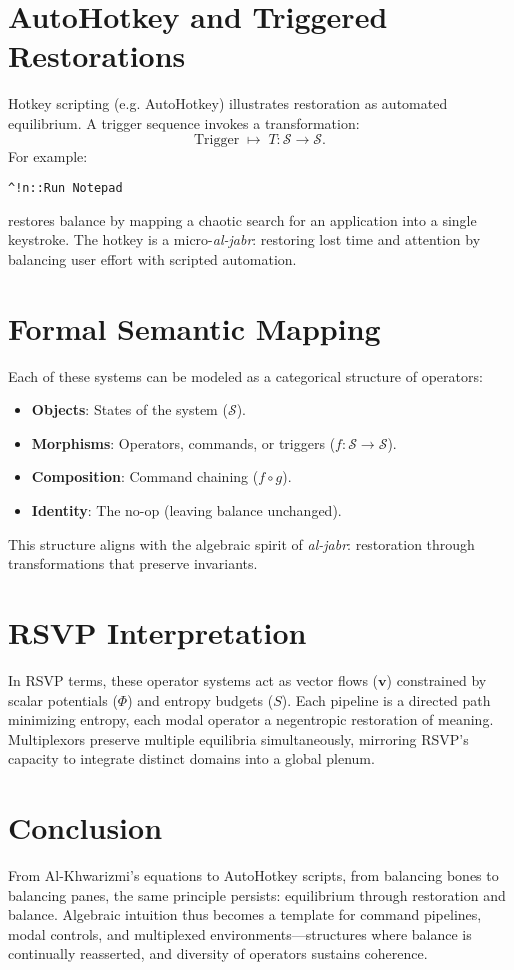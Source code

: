 \documentclass[a4paper,11pt,openany]{book}
\begin{document}
\section{AutoHotkey and Triggered Restorations}
Hotkey scripting (e.g. AutoHotkey) illustrates restoration as automated equilibrium. A trigger sequence invokes a transformation:
\[
\text{Trigger} \;\mapsto\; T : \mathcal{S} \to \mathcal{S}.
\]
For example:
\begin{verbatim}
^!n::Run Notepad
\end{verbatim}
restores balance by mapping a chaotic search for an application into a single keystroke. The hotkey is a micro-\emph{al-jabr}: restoring lost time and attention by balancing user effort with scripted automation.

\section{Formal Semantic Mapping}
Each of these systems can be modeled as a categorical structure of operators:
\begin{itemize}
  \item \textbf{Objects}: States of the system ($\mathcal{S}$).
  \item \textbf{Morphisms}: Operators, commands, or triggers ($f:\mathcal{S}\to\mathcal{S}$).
  \item \textbf{Composition}: Command chaining ($f\circ g$).
  \item \textbf{Identity}: The no-op (leaving balance unchanged).
\end{itemize}
This structure aligns with the algebraic spirit of \emph{al-jabr}: restoration through transformations that preserve invariants.

\section{RSVP Interpretation}
In RSVP terms, these operator systems act as vector flows ($\mathbf{v}$) constrained by scalar potentials ($\Phi$) and entropy budgets ($S$). Each pipeline is a directed path minimizing entropy, each modal operator a negentropic restoration of meaning. Multiplexors preserve multiple equilibria simultaneously, mirroring RSVP’s capacity to integrate distinct domains into a global plenum.

\section{Conclusion}
From Al-Khwarizmi’s equations to AutoHotkey scripts, from balancing bones to balancing panes, the same principle persists: equilibrium through restoration and balance. Algebraic intuition thus becomes a template for command pipelines, modal controls, and multiplexed environments—structures where balance is continually reasserted, and diversity of operators sustains coherence.
\end{document}
